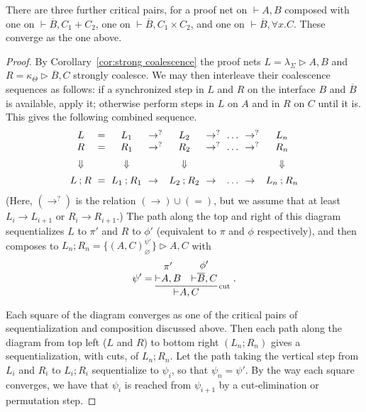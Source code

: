 \documentclass[UKenglish]{lipics-v2016}
\makeatletter
\theoremstyle{plain}
\newcommand\+{+}
\renewcommand\*{\times}
\newcommand\dual[1]{\overline{#1}}
\newcommand\seq[2]{{\vdash}#1,#2}
\newcommand\Seq{\vphantom(\seq}
\newcommand\Prf[3]{\deduce{\Seq{#2}{#3}}{\vphantom(#1}}
\newcommand\net[3]{#1\triangleright #2,#3}
\newcommand\comp{\mathbin;}
\newcommand\link[3][\sigma]{(#2,#3)_{#1}}
\newcommand\scoal{\rightarrow} %
\newcommand\Qrr{\!\!\scriptstyle\qrr}
\newcommand\qrr[1]{
  \ifx#1+\expandafter\@qrr\else
  \ifx#1*\*\mathrm R\else
  \ifx#1!\forall\mathrm R\else
  \ifx#1?\expandafter\@@qrr\else
  \ifx#11\mathrm{ax}\else
  \ifx#1.\mathrm{cut}\else
  #1\mathrm R
  \fi\fi\fi\fi\fi\fi
}
\newcommand\@qrr[1]{+\mathrm R,#1}
\newcommand\@@qrr[1]{\exists\mathrm R,#1}
\makeatother
\begin{document}
There are three further critical pairs, for a proof net on $\seq AB$ composed with one on $\seq {\dual B}{C_1{\+}C_2}$, one on $\seq {\dual B}{C_1{\*}C_2}$, and one on $\seq {\dual B}{\forall x.C}$. These converge as the one above.


\begin{proof}
By Corollary~\ref{cor:strong coalescence} the proof nets $L=\net{\lambda_\Sigma}AB$ and $R=\net{\kappa_\Theta}{\dual B}C$ strongly coalesce. We may then interleave their coalescence sequences as follows: if a synchronized step in $L$ and $R$ on the interface $B$ and $\dual B$ is available, apply it; otherwise perform steps in $L$ on $A$ and in $R$ on $C$ until it is. This gives the following combined sequence.
\[
\begin{array}{c@{~}c@{~}c@{~}l@{~}c@{~}l@{~}c@{~}l@{~}c}
	L &{}={}& L_1 & ~\scoal^?~ & L_2 & ~\scoal^?~ & \dots & ~\scoal^?~ & L_n 
\\
	R &{}={}& R_1 & ~\scoal^?~ & R_2 & ~\scoal^?~ & \dots & ~\scoal^?~ & R_n 
\\[5pt]
	\Downarrow && \Downarrow && \Downarrow &&&& \Downarrow 
\\[5pt]
	L\comp R & = & L_1\comp R_1 & ~\scoal~ & L_2\comp R_2 & ~\scoal~ & \dots & ~\scoal~ & L_n\comp R_n
\end{array}
\]
(Here, $(\scoal^?)$ is the relation $(\scoal)\cup(=)$, but we assume that at least $L_i\scoal L_{i+1}$ or $R_i\scoal R_{i+1}$.)
%
The path along the top and right of this diagram sequentializes $L$ to $\pi'$ and $R$ to $\phi'$ (equivalent to $\pi$ and $\phi$ respectively), and then composes to $L_n\comp R_n = \net{\{\link[\varnothing]AC^{\psi'}\}}AC$ with
\[
	\psi' = \vc{\infer[\!\!\scriptstyle{\mathrm{cut}}]{\seq AC}{\Prf{\pi'}AB & \Prf{\phi'}{\dual B}C}}~.
\]

Each square of the diagram converges as one of the critical pairs of sequentialization and composition discussed above. Then each path along the diagram from top left ($L$ and $R$) to bottom right $(L_n\comp R_n)$ gives a sequentialization, with cuts, of $L_n\comp R_n$. Let the path taking the vertical step from $L_i$ and $R_i$ to $L_i\comp R_i$ sequentialize to $\psi_i$, so that $\psi_n=\psi'$. By the way each square converges, we have that $\psi_i$ is reached from $\psi_{i+1}$ by a cut-elimination or permutation step. 


\end{proof}
\end{document}
